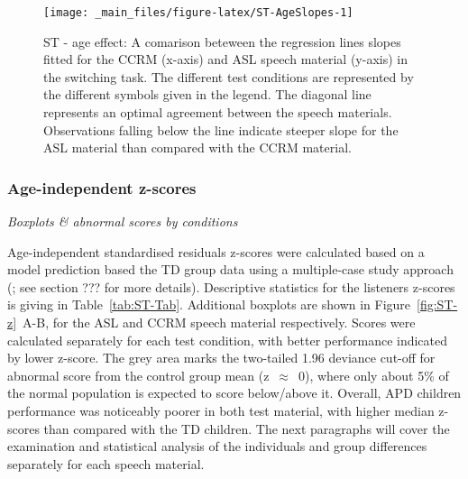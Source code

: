 \documentclass[a4paper, twoside]{templates/ociamthesis}
\begin{document}
\begin{figure}

{\centering \texttt{[image: \_main\_files/figure-latex/ST-AgeSlopes-1]} 

}

\caption{ST - age effect: A comarison beteween the regression lines slopes fitted for the CCRM (x-axis) and ASL speech material (y-axis) in the switching task. The different test conditions are represented by the different symbols given in the legend. The diagonal line represents an optimal agreement between the speech materials. Observations falling below the line indicate steeper slope for the ASL material than compared with the CCRM material.}\label{fig:ST-AgeSlopes}
\end{figure}

\hypertarget{age-independent-z-scores}{%
\subsubsection*{Age-independent z-scores}\label{age-independent-z-scores}}

\colorbox[HTML]{CCCCFF}{\emph{Boxplots \& abnormal scores by conditions}}

Age-independent standardised residuals z-scores were calculated based on a model prediction based the TD group data using a multiple-case study approach (\textcite{Ramus2003}; see section ??? for more details). Descriptive statistics for the listeners z-scores is giving in Table~\ref{tab:ST-Tab}. Additional boxplots are shown in Figure~\ref{fig:ST-z}~A-B, for the ASL and CCRM speech material respectively. Scores were calculated separately for each test condition, with better performance indicated by lower z-score. The grey area marks the two-tailed 1.96 deviance cut-off for abnormal score from the control group mean (z~\(\approx\)~0), where only about 5\% of the normal population is expected to score below/above it. Overall, APD children performance was noticeably poorer in both test material, with higher median z-scores than compared with the TD children. The next paragraphs will cover the examination and statistical analysis of the individuals and group differences separately for each speech material.
\end{document}
